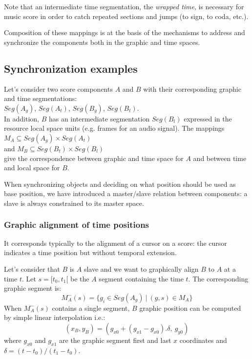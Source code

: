\documentclass{article}
\newcommand{\seg}[1]			{Seg(#1)}
\newcommand{\rshift}			{\hspace*{9mm}}
\begin{document}
Note that an intermediate time segmentation, the \emph{wrapped time}, is necessary for music score in order to catch repeated sections and jumps (to sign, to coda, etc.).

Composition of these mappings is at the basis of the mechanisms to address and synchronize the components both in the graphic and time spaces.


\subsection{Synchronization examples}
Let's consider two score components $A$ and $B$ with their corresponding graphic and time segmentations: 
\vspace{1mm}\\
\rshift $\seg{A_g}$, $\seg{A_t}$, $\seg{B_g}$, $\seg{B_t}$. 
\vspace{1mm}\\
In addition, $B$ has an intermediate segmentation $\seg{B_l}$ expressed in the resource local space units (e.g. frames for an audio signal).
The mappings
\vspace{1mm}\\
\hspace*{5mm} $M_A \subseteq \seg{A_{g}}\times \seg{A_{t}}$ \\
and $M_B \subseteq \seg{B_{t}}\times \seg{B_{l}}$ 
\vspace{1mm}\\
give the correspondence between graphic and time space for $A$ and between time and local space for $B$.

When synchronizing objects and deciding on what position should be used as base position, we have introduced a master/slave relation between components: a slave is always constrained to its master space.

\subsubsection{Graphic alignment of time positions}

It corresponds typically to the alignment of a cursor on a score: the cursor indicates a time position but without temporal extension. 

Let's consider that $B$ is $A$ slave and we want to graphically align $B$ to $A$ at a time $t$. Let $s = [t_0, t_1[$ be the $A$ segment containing the time $t$. The corresponding graphic segment is:
\[
	M_A^{-}(s) =\{ g_i \in \seg{A_{g}}\ |\ (g,s)\in M_A\}
\]
When $M_A^{-}(s)$ contains a single segment, $B$ graphic position can be computed by simple linear interpolation i.e.:
\[
(x_B, y_B) = (g_{x0} + (g_{x1} - g_{x0}). \delta,\ g_{y0})
\]
where $g_{x0}$ and $g_{x1}$ are the graphic segment first and last $x$ coordinates and 
$\delta = (t - t_0) / (t_1 - t_0)$.
\end{document}

